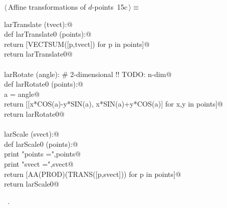 \documentclass[11pt,oneside]{article}	%
\begin{document}
\begin{flushleft} \small \label{scrap32}
\protect{}$\langle\,$Affine transformations of $d$-points\nobreak\ {\footnotesize 15c}$\,\rangle\equiv$
\vspace{-1ex}
\begin{list}{}{} \item
\mbox{}\verb@def larTranslate (tvect):@\\
\mbox{}\verb@   def larTranslate0 (points):@\\
\mbox{}\verb@      return [VECTSUM([p,tvect]) for p in points]@\\
\mbox{}\verb@   return larTranslate0@\\
\mbox{}\verb@@\\
\mbox{}\verb@def larRotate (angle):     # 2-dimensional !! TODO: n-dim@\\
\mbox{}\verb@   def larRotate0 (points):@\\
\mbox{}\verb@      a = angle@\\
\mbox{}\verb@      return [[x*COS(a)-y*SIN(a), x*SIN(a)+y*COS(a)] for x,y in points]@\\
\mbox{}\verb@   return larRotate0@\\
\mbox{}\verb@@\\
\mbox{}\verb@def larScale (svect):@\\
\mbox{}\verb@   def larScale0 (points):@\\
\mbox{}\verb@      print "\n points =",points@\\
\mbox{}\verb@      print "\n svect =",svect@\\
\mbox{}\verb@      return [AA(PROD)(TRANS([p,svect])) for p in points]@\\
\mbox{}\verb@   return larScale0@\\
\mbox{}\verb@@{\NWsep}
\end{list}
\vspace{-1ex}
\footnotesize\addtolength{\baselineskip}{-1ex}
\begin{list}{}{\setlength{\itemsep}{-\parsep}\setlength{\itemindent}{-\leftmargin}}
\item \NWtxtMacroRefIn\ .
\end{list}
\end{flushleft}
\end{document}
